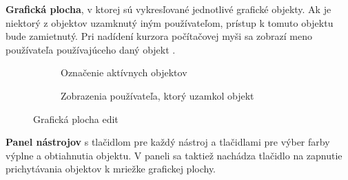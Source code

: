 \textbf{Grafická plocha}, v ktorej sú vykresľované jednotlivé grafické objekty. Ak je niektorý z objektov uzamknutý iným používateľom, prístup k tomuto objektu bude zamietnutý. Pri nadídení kurzora počítačovej myši sa zobrazí meno používateľa používajúceho daný objekt .
\begin{figure}[H]
	\centering
	\begin{subfigure}[t]{0.48\linewidth}	
		\caption{Označenie aktívnych objektov}
		\label{obr:canvas-selected}
	\end{subfigure}
	\quad
	\begin{subfigure}[t]{0.48\linewidth}	
		\caption{Zobrazenia používateľa, ktorý uzamkol objekt}
		\label{obr:canvas-locked}
	\end{subfigure}
	
	\caption{Grafická plocha edit}
\end{figure}

 \textbf{Panel nástrojov} s tlačidlom pre každý nástroj a tlačidlami pre výber farby výplne a obtiahnutia objektu. V paneli sa taktiež nachádza tlačidlo na zapnutie prichytávania objektov k mriežke grafickej plochy.
	
